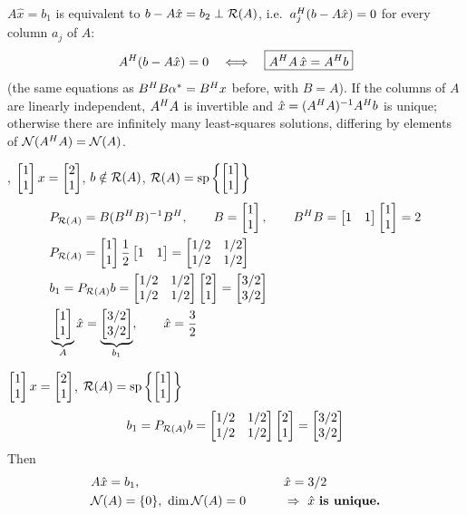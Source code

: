 \begin{insight}
$A\hat x = b_1$ is equivalent to $b - A\hat x = b_2 \perp \mathcal{R}(A)$, i.e.\ $a_j^{H}(b-A\hat x) = 0$ for every
column $a_j$ of $A$:
\[
A^{H}(b-A\hat x) = 0 \quad\Longleftrightarrow\quad \boxed{A^{H} A\,\hat x = A^{H} b}
\]
(the same equations as $B^{H} B\alpha^* = B^{H} x$ before, with $B=A$).  If the columns of $A$ are linearly independent, $A^{H} A$ is invertible and
$\hat x = (A^{H} A)^{-1}A^{H} b$ is unique; otherwise there are infinitely many least-squares solutions,
differing by elements of $\mathcal{N}(A^{H} A)=\mathcal{N}(A)$.
\end{insight}

\sep
\point $\displaystyle \begin{bmatrix}1\\1\end{bmatrix}x = \begin{bmatrix}2\\1\end{bmatrix}$, \qquad $b\notin\mathcal{R}(A)$, \qquad
$\mathcal{R}(A) = \operatorname{sp}\left\{\begin{bmatrix}1\\1\end{bmatrix}\right\}$
\begin{align*}
&P_{\mathcal{R}(A)} = B(B^{H} B)^{-1}B^{H}, \qquad B = \begin{bmatrix}1\\1\end{bmatrix}, \qquad B^{H} B = \begin{bmatrix}1&1\end{bmatrix}\begin{bmatrix}1\\1\end{bmatrix} = 2\\
&P_{\mathcal{R}(A)} = \begin{bmatrix}1\\1\end{bmatrix}\frac12\begin{bmatrix}1&1\end{bmatrix} = \begin{bmatrix}1/2&1/2\\1/2&1/2\end{bmatrix}\\
&b_1 = P_{\mathcal{R}(A)}b = \begin{bmatrix}1/2&1/2\\1/2&1/2\end{bmatrix}\begin{bmatrix}2\\1\end{bmatrix} = \begin{bmatrix}3/2\\3/2\end{bmatrix}\\
&\underbrace{\begin{bmatrix}1\\1\end{bmatrix}}_{A}\hat x = \underbrace{\begin{bmatrix}3/2\\3/2\end{bmatrix}}_{b_1},
\qquad \hat x = \frac32
\end{align*}

\point $\displaystyle \begin{bmatrix}1\\1\end{bmatrix}x = \begin{bmatrix}2\\1\end{bmatrix}$, \qquad
$\mathcal{R}(A) = \operatorname{sp}\left\{\begin{bmatrix}1\\1\end{bmatrix}\right\}$
\[
b_1 = P_{\mathcal{R}(A)}b = \begin{bmatrix}1/2&1/2\\1/2&1/2\end{bmatrix}\begin{bmatrix}2\\1\end{bmatrix} = \begin{bmatrix}3/2\\3/2\end{bmatrix}
\]
Then
\begin{alignat*}{2}
&A\hat x = b_1, &\qquad& \hat x = 3/2\\
&\Null(A) = \{0\},\ \dim\Null(A) = 0 &\qquad& \Rightarrow\ \hat x \text{ \key{is unique.}}
\end{alignat*}

